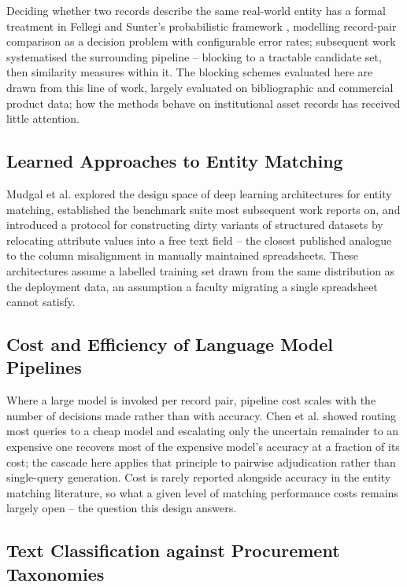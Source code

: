 \documentclass[conference]{IEEEtran}
\begin{document}
Deciding whether two records describe the same real-world entity has a
formal treatment in Fellegi and Sunter's probabilistic framework
\cite{fellegi1969}, modelling record-pair comparison as a decision
problem with configurable error rates; subsequent work systematised
the surrounding pipeline -- blocking to a tractable candidate set,
then similarity measures within it. The blocking
schemes evaluated here are drawn from this line of work, largely
evaluated on bibliographic and commercial product data; how the
methods behave on institutional asset records has received little
attention.

\subsection{Learned Approaches to Entity Matching}

Mudgal et al. \cite{mudgal2018} explored the design space of deep
learning architectures for entity matching, established the benchmark
suite most subsequent work reports on, and introduced a protocol for
constructing dirty variants of structured datasets by relocating
attribute values into a free text field -- the closest published
analogue to the column misalignment in manually maintained
spreadsheets. These architectures assume a labelled training set drawn
from the same distribution as the deployment data, an assumption a
faculty migrating a single spreadsheet cannot satisfy.

\subsection{Cost and Efficiency of Language Model Pipelines}

Where a large model is invoked per record pair, pipeline cost scales
with the number of decisions made rather than with accuracy. Chen et al. \cite{chen2023frugalgpt} showed routing most queries to a
cheap model and escalating only the uncertain remainder to an expensive
one recovers most of the expensive model's accuracy at a fraction of
its cost; the cascade here applies that principle to pairwise
adjudication rather than single-query generation. Cost is rarely
reported alongside accuracy in the entity matching literature, so what a
given level of matching performance costs remains largely open -- the
question this design answers.

\subsection{Text Classification against Procurement Taxonomies}
\end{document}
